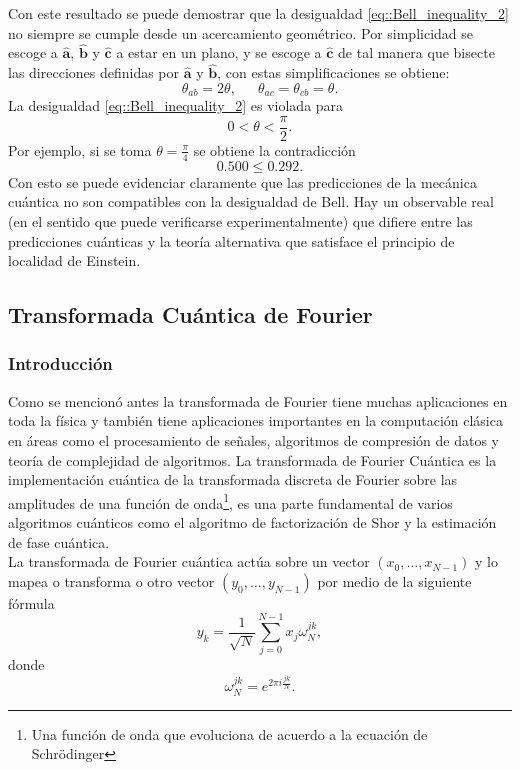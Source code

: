 \documentclass[a4paper]{article}
\begin{document}
Con este resultado se puede demostrar que la desigualdad \ref{eq::Bell_inequality_2} no siempre se cumple desde un acercamiento geométrico. Por simplicidad se escoge a $\mathbf{\hat{a}}$, $\mathbf{\hat{b}}$ y $\mathbf{\hat{c}}$ a estar en un plano, y se escoge a $\mathbf{\hat{c}}$ de tal manera que bisecte las direcciones definidas por $\mathbf{\hat{a}}$ y $\mathbf{\hat{b}}$, con estas simplificaciones se obtiene:
\begin{equation}
\theta_{ab}=2\theta,\,\,\,\,\,\,\,\,\, \theta_{ac}=\theta_{cb}=\theta.
\end{equation}
La desigualdad \ref{eq::Bell_inequality_2} es violada para
\begin{equation}
0<\theta<\frac{\pi}{2}.
\end{equation}
Por ejemplo, si se toma $\theta=\frac{\pi}{4}$ se obtiene la contradicción
\begin{equation}
0.500\leq 0.292.
\end{equation}
Con esto se puede evidenciar claramente que las predicciones de la mecánica cuántica no son compatibles con la desigualdad de Bell. Hay un observable real (en el sentido que puede verificarse experimentalmente) que difiere entre las predicciones cuánticas y la teoría alternativa que satisface el principio de localidad de Einstein.


\subsection{Transformada Cuántica de Fourier}
\subsubsection{Introducción}
Como se mencionó antes la transformada de Fourier tiene muchas aplicaciones en toda la física y también tiene aplicaciones importantes en la computación clásica en áreas como el procesamiento de señales, algoritmos de compresión de datos y teoría de complejidad de algoritmos. La transformada de Fourier Cuántica es la implementación cuántica de la transformada discreta de Fourier sobre las amplitudes de una función de onda\footnote{Una función de onda que evoluciona de acuerdo a la ecuación de Schr\"{o}dinger}, es una parte fundamental de varios algoritmos cuánticos  como el algoritmo de factorización de Shor y la estimación de fase cuántica.\\
La transformada de Fourier cuántica actúa sobre un vector $(x_0, \hdots, x_{N-1})$ y lo mapea o transforma o otro vector
$(y_0, \hdots, y_{N-1})$ por medio de la siguiente fórmula
\begin{equation}
y_{k}=\frac{1}{\sqrt{N}}\sum_{j=0}^{N-1}x_j \omega_{N}^{jk},
\end{equation}
donde 
\begin{equation}\label{eq::omega_definition}
\omega_{N}^{jk}=e^{2\pi i \frac{jk}{N}}.
\end{equation}
\end{document}

